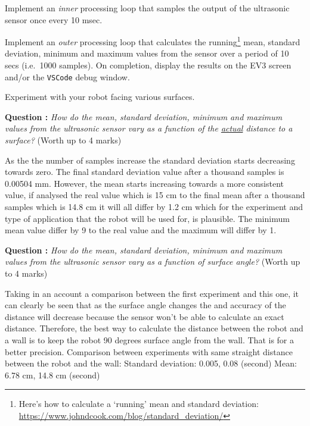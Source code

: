 \documentclass[hidelinks,a4paper,11pt]{article}
\newcounter{question}
\newcommand\myq{\refstepcounter{question}\thequestion}
\begin{document}
\begin{todolist}
	\item Implement an \emph{inner} processing loop that samples the output of the ultrasonic sensor once every 10 msec.
	\item Implement an \emph{outer} processing loop that calculates the running\footnote{Here's how to calculate a `running' mean and standard deviation: \url{https://www.johndcook.com/blog/standard_deviation/}} mean, standard deviation, minimum and maximum values from the sensor over a period of 10 secs (i.e.\ 1000 samples).  On completion, display the results on the EV3 screen and/or the \texttt{VSCode} debug window.
	\item Experiment with your robot facing various surfaces.
\end{todolist}

{\bfseries Question \myq:}  \emph{How do the mean, standard deviation, minimum and maximum values from the ultrasonic sensor vary as a function of the \underline{actual} distance to a surface?} (Worth up to 4 marks)\\
\begin{mdframed}
As the the number of samples increase the standard deviation starts decreasing towards zero. The final standard deviation value after a thousand samples is 0.00504 mm. However, the mean starts increasing towards a more consistent value, if analysed the real value which is 15 cm to the final mean after a thousand samples which is 14.8 cm it will all differ by 1.2 cm which for the experiment and type of application that the robot will be used for, is plausible. The minimum mean value differ by 9 to the real value and the maximum will differ by 1.
  \end{mdframed}
\vspace*{\baselineskip}

{\bfseries Question \myq:}  \emph{How do the mean, standard deviation, minimum and maximum values from the ultrasonic sensor vary as a function of surface angle?} (Worth up to 4 marks)\\
\begin{mdframed}
Taking in an account a comparison between the first experiment and this one, it can clearly be seen that as the surface angle changes the and accuracy of the distance will decrease because the sensor won't be able to calculate an exact distance. Therefore, the best way to calculate the distance between the robot and a wall is to keep the robot 90 degrees surface angle from the wall. That is for a better precision. 
Comparison between experiments with same straight distance between the robot and the wall:
Standard deviation: 0.005, 0.08 (second)
Mean: 6.78 cm, 14.8 cm (second)
\end{mdframed}
\vspace*{\baselineskip}
\end{document}
